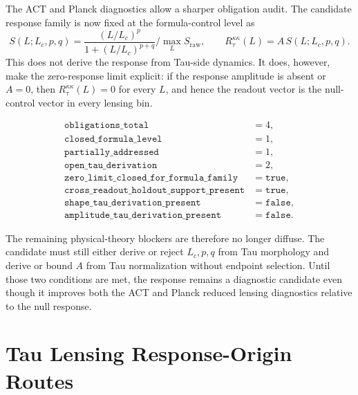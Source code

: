 \documentclass[11pt]{article}
\begin{document}
The ACT and Planck diagnostics allow a sharper obligation audit. The candidate
response family is now fixed at the formula-control level as
\[
S(L;L_c,p,q)=
\frac{(L/L_c)^p}{1+(L/L_c)^{p+q}}\bigg/\max_L S_{\mathrm{raw}},
\qquad
R_{\tau}^{\kappa\kappa}(L)=A\,S(L;L_c,p,q).
\]
This does not derive the response from Tau-side dynamics. It does, however,
make the zero-response limit explicit: if the response amplitude is absent or
\(A=0\), then \(R_{\tau}^{\kappa\kappa}(L)=0\) for every \(L\), and hence the
readout vector is the null-control vector in every lensing bin.

\[
\begin{array}{ll}
\texttt{obligations\_total} &= 4,\\
\texttt{closed\_formula\_level} &= 1,\\
\texttt{partially\_addressed} &= 1,\\
\texttt{open\_tau\_derivation} &= 2,\\
\texttt{zero\_limit\_closed\_for\_formula\_family} &= \texttt{true},\\
\texttt{cross\_readout\_holdout\_support\_present} &= \texttt{true},\\
\texttt{shape\_tau\_derivation\_present} &= \texttt{false},\\
\texttt{amplitude\_tau\_derivation\_present} &= \texttt{false}.
\end{array}
\]

The remaining physical-theory blockers are therefore no longer diffuse. The
candidate must still either derive or reject \(L_c,p,q\) from Tau morphology and
derive or bound \(A\) from Tau normalization without endpoint selection. Until
those two conditions are met, the response remains a diagnostic candidate even
though it improves both the ACT and Planck reduced lensing diagnostics relative
to the null response.

\section{Tau Lensing Response-Origin Routes}
\end{document}
